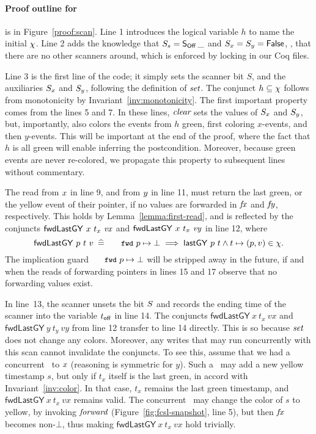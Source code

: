 \def\botLGY{{\ensuremath{\mathsf{fwdLastGY}}}}
\def\histLGY{{\ensuremath{\mathsf{lastGYHist}}}}
\def\greenH{{\ensuremath{\mathsf{green\_prefix}}}}
\newcommand{\spz}{S_z}



\paragraph{Proof outline for \jyscan} is in Figure~\ref{proof:scan}. Line 1
introduces the logical variable $h$ to name the initial $\chi$. Line
2 adds the knowledge that $S_s = \mathsf{S_{Off}}\, \_$ and $S_x = S_y = \mathsf{False}$,
\ie, that there are no other scanners around, which is enforced by
locking in our Coq files.

Line 3 is the first line of the code; it simply sets the scanner bit
$S$, and the auxiliaries $S_x$ and $S_y$, following the definition of
$\textit{set}$. The conjunct $h \subseteq \chi$ follows from
monotonicity by Invariant~\ref{inv:monotonicity}.
%
The first important property comes from the lines 5 and 7. In these
lines, $\textit{clear}$ sets the values of $S_x$ and $S_y$, but,
importantly, also colors the events from $h$ green, first coloring
$x$-events, and then $y$-events. This will be important at the end of
the proof, where the fact that $h$ is all green will enable inferring
the postcondition. Moreover, because green events are never
re-colored, we propagate this property to subsequent lines without
commentary.

The read from $x$ in line 9, and from $y$ in line 11, must return
the last green, or the yellow event of their pointer, if no values are
forwarded in $\mathit{fx}$ and $\mathit{fy}$, respectively. This holds by
Lemma~\ref{lemma:first-read}, and is reflected by the conjuncts
$\botLGY\ x\ t_x\ \var{vx}$ and $\botLGY\ x\ t_x\ \var{vy}$ in line
12, where
\[
 \botLGY\ p\ t\ v \eqdef \aleksfwdp{p} \hpts \bot
 \implies \lgVy\ p\ t \wedge t \hpts (p, v) \in \hist.
\]
The implication guard $\aleksfwdp{p} \hpts \bot$ will be stripped away
in the future, if and when the reads of forwarding pointers in lines
15 and 17 observe that no forwarding values exist.

In line~13, the scanner unsets the bit $S$ and records the ending
time of the scanner into the variable $t_{\mathsf{off}}$ in line 14. The
conjuncts $\botLGY\ x\ t_x\ vx$ and $\botLGY\ y\ t_y\ vy$ from line 12
transfer to line 14 directly. This is so because $\textit{set}$ does not
change any colors. Moreover, any writes that may run concurrently with
this scan cannot invalidate the conjuncts. To see this, assume that we
had a concurrent \jywrite\ to $x$ (reasoning is symmetric for $y$).
Such a \jywrite\ may add a new yellow timestamp $s$, but only if $t_x$
itself is the last green, in accord with Invariant~\ref{inv:color}. In
that case, $t_x$ remains the last green timestamp, and
$\botLGY\ x\ t_x\ vx$ remains valid. The concurrent \jywrite\ may
change the color of $s$ to yellow, by invoking $\textit{forward}$
(Figure~\ref{fig:fcsl-snapshot}, line 5), but then $\mathit{fx}$ becomes
non-$\bot$, thus making $\botLGY\ x\ t_x\ vx$ hold trivially.

